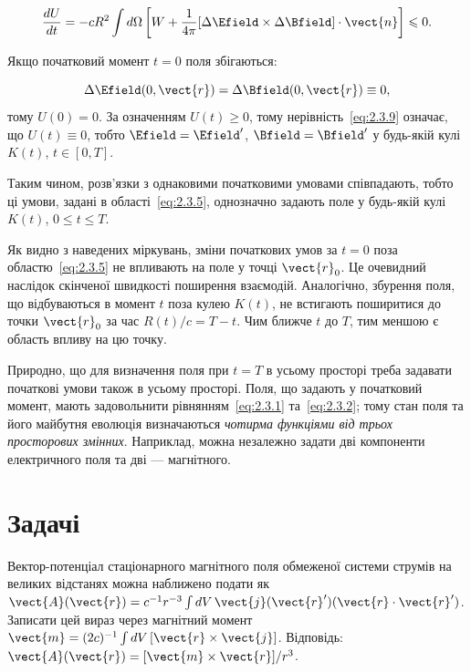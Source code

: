 \begin{equation}\label{eq:2.3.9}
\frac{dU}{dt} = -c R^2 \int d\Omega \left[ W + \frac1{4\pi}  [\Delta \Efield \times \Delta \Bfield] \cdot \vect{n} \right]\leqslant 0.
\end{equation}

Якщо початковий момент \( t = 0 \) поля збігаються:

\begin{equation*}
\Delta \Efield(0, \vect{r}) = \Delta \Bfield(0, \vect{r}) \equiv 0,
\end{equation*}
%
тому \( U(0) = 0 \). За означенням \( U(t) \geqslant0 \), тому нерівність~\eqref{eq:2.3.9} означає, що \( U(t) \equiv 0 \), тобто \( \Efield = \Efield'
\), \( \Bfield = \Bfield' \) у будь-якій кулі \( K(t) \), \( t \in [0, T] \).

Таким чином, розв’язки з однаковими початковими умовами співпадають, тобто ці умови, задані в області~\eqref{eq:2.3.5}, однозначно задають поле у
будь-якій кулі \( K(t) \), \( 0 \leqslant t \leqslant T \).

Як видно з наведених міркувань, зміни початкових умов за \( t = 0 \) поза областю~\eqref{eq:2.3.5} не впливають на поле у точці \( \vect{r}_0 \). Це
очевидний наслідок скінченої швидкості поширення взаємодій. Аналогічно, збурення поля, що відбуваються в момент \( t \) поза кулею \( K(t) \), не
встигають поширитися до точки \( \vect{r}_0 \) за час \( R(t)/c = T - t \). Чим ближче \( t \) до \( T \), тим меншою є область впливу на цю точку.

Природно, що для визначення поля при \( t = T \) в усьому просторі треба задавати початкові умови також в усьому просторі. Поля, що задають у початковий
момент, мають задовольнити рівнянням~\eqref{eq:2.3.1} та~\eqref{eq:2.3.2}; тому стан поля та його майбутня еволюція визначаються \emph{чотирма функціями
від трьох просторових змінних}. Наприклад, можна незалежно задати дві компоненти електричного поля та дві --- магнітного.

\section*{Задачі}

\begin{problem}%
Вектор-потенціал стаціонарного магнітного поля обмеженої системи струмів на великих відстанях можна наближено подати як \( \vect{A}(\vect{r}) =
c^{-1} r^{-3} \int dV \, \vect{j}(\vect{r}')(\vect{r} \cdot \vect{r}') \). Записати цей вираз через магнітний момент \( \vect{m} = (2c)^{-1} \int dV \,
[\vect{r} \times \vect{j}] \). Відповідь: \( \vect{A}(\vect{r}) = [\vect{m} \times \vect{r}] / r^3 \).
\end{problem}


